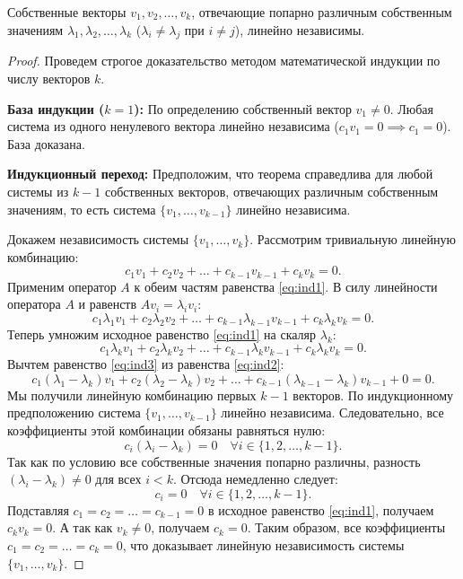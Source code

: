     \begin{theorem}
        Собственные векторы $v_1, v_2, \dots, v_k$, отвечающие попарно различным собственным значениям $\lambda_1,
        \lambda_2, \dots, \lambda_k$ ($\lambda_i \ne \lambda_j$ при $i \ne j$), линейно независимы.
    \end{theorem}
    \begin{proof}
        Проведем строгое доказательство методом математической индукции по числу векторов $k$.

        \textbf{База индукции ($k = 1$):} По определению собственный вектор $v_1 \ne 0$.
        Любая система из одного ненулевого вектора линейно независима ($c_1 v_1 = 0 \implies c_1 = 0$).
        База доказана.

        \textbf{Индукционный переход:} Предположим, что теорема справедлива для любой системы из $k - 1$ собственных
        векторов, отвечающих различным собственным значениям, то есть система $\{v_1, \dots, v_{k-1}\}$ линейно
        независима.

        Докажем независимость системы $\{v_1, \dots, v_k\}$.
        Рассмотрим тривиальную линейную комбинацию:
        \begin{equation} \label{eq:ind1} c_1 v_1 + c_2 v_2 + \dots + c_{k-1} v_{k-1} + c_k v_k = 0.
        \end{equation}
        Применим оператор $A$ к обеим частям равенства \eqref{eq:ind1}.
        В силу линейности оператора $A$ и равенств $A v_i = \lambda_i v_i$:
        \begin{equation} \label{eq:ind2}
            c_1 \lambda_1 v_1 + c_2 \lambda_2 v_2 + \dots + c_{k-1} \lambda_{k-1} v_{k-1} + c_k \lambda_k v_k = 0.
        \end{equation}
        Теперь умножим исходное равенство \eqref{eq:ind1} на скаляр $\lambda_k$:
        \begin{equation} \label{eq:ind3}
            c_1 \lambda_k v_1 + c_2 \lambda_k v_2 + \dots + c_{k-1} \lambda_k v_{k-1} + c_k \lambda_k v_k = 0.
        \end{equation}
        Вычтем равенство \eqref{eq:ind3} из равенства \eqref{eq:ind2}:
        \[ c_1 (\lambda_1 - \lambda_k) v_1 + c_2 (\lambda_2 - \lambda_k) v_2 + \dots + c_{k-1} (\lambda_{k-1} -
        \lambda_k) v_{k-1} + 0 = 0. \]
        Мы получили линейную комбинацию первых $k - 1$ векторов.
        По индукционному предположению система $\{v_1, \dots, v_{k-1}\}$ линейно независима.
        Следовательно, все коэффициенты этой комбинации обязаны равняться нулю:
        \[ c_i (\lambda_i - \lambda_k) = 0 \quad \forall i \in \{1, 2, \dots, k-1\}. \]
        Так как по условию все собственные значения попарно различны, разность $(\lambda_i - \lambda_k) \ne 0$ для всех
        $i < k$.
        Отсюда немедленно следует:
        \[ c_i = 0 \quad \forall i \in \{1, 2, \dots, k-1\}. \]
        Подставляя $c_1 = c_2 = \dots = c_{k-1} = 0$ в исходное равенство \eqref{eq:ind1}, получаем $c_k v_k = 0$.
        А так как $v_k \ne 0$, получаем $c_k = 0$.
        Таким образом, все коэффициенты $c_1 = c_2 = \dots = c_k = 0$, что доказывает линейную независимость системы
        $\{v_1, \dots, v_k\}$.
    \end{proof}

